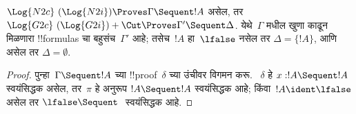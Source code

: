 \documentclass[../../../include/open-logic-section]{subfiles}
\begin{document}


\begin{prop}
$\Log{N2c}\ (\Log{N2i}) \Proves
\Gamma \Sequent !A$ असेल, तर
$\Log{G2c}\ (\Log{G2i}) + \Cut \Proves \Gamma'
\Sequent \Delta$. येथे~$\Gamma$ मधील
खुणा काढून मिळणारा !!{formula}s चा
बहुसंच~$\Gamma'$ आहे; तसेच~$!A$
हा~$\lfalse$ नसेल तर
$\Delta = \{!A\}$, आणि असेल तर
$\Delta = \emptyset$.
\end{prop}

\begin{proof}
पुन्हा~$\Gamma \Sequent !A$ च्या
!!{proof}~$\delta$ च्या उंचीवर
विगमन करू. ~$\delta$ हे
$x:!A \Sequent !A$ स्वयंसिद्धक
असेल, तर~$\pi$ हे अनुरूप
$!A \Sequent !A$ स्वयंसिद्धक
आहे; किंवा~$!A \ident \lfalse$
असेल तर
$\lfalse \Sequent \ $ स्वयंसिद्धक आहे.


\end{proof}
\end{document}
